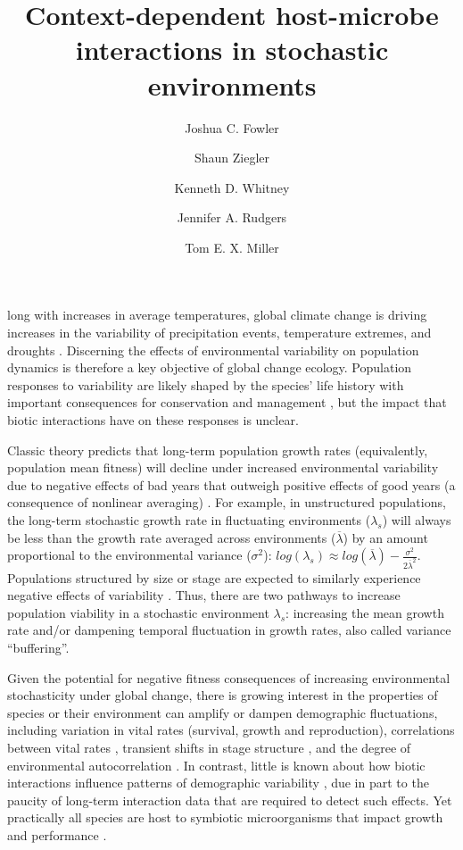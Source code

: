 \documentclass[9pt,twocolumn,twoside,lineno]{pnas-new}\usepackage[]{graphicx}\usepackage[]{xcolor}
\title{Context-dependent host-microbe interactions in stochastic environments}
\author[a,1]{Joshua C. Fowler}
\author[b]{Shaun Ziegler}
\author[b]{Kenneth D. Whitney}
\author[b]{Jennifer A. Rudgers}
\author[a]{Tom E. X. Miller}
\affil[a]{Rice University, Department of BioSciences, Houston, TX, 77005}
\affil[b]{University of New Mexico, Department of Biology, Albuquerque, NM, 87131}
\begin{document}
\maketitle
\thispagestyle{firststyle}

long with increases in average temperatures, global climate change is driving increases in the variability of precipitation events, temperature extremes, and droughts \cite{IPCC2012managing, seneviratne2012changes, stocker2013technical}.
Discerning the effects of environmental variability on population dynamics is therefore a key objective of global change ecology. 
Population responses to variability are likely shaped by the species' life history \cite{pfister1998patterns, morris2008longevity, saether2013life} with important consequences for conservation and management \cite{menges2000applications}, but the impact that biotic interactions have on these responses is unclear.

Classic theory predicts that long-term population growth rates (equivalently, population mean fitness) will decline under increased environmental variability due to negative effects of bad years that outweigh positive effects of good years (a consequence of nonlinear averaging) \cite{lewontin_population_1969,tuljapurkar_population_1982}.
For example, in unstructured populations, the long-term stochastic growth rate in fluctuating environments ($\lambda_s$) will always be less than the growth rate averaged across environments ($\overline{\lambda}$) by an amount proportional to the environmental variance ($\sigma^2$): $ log(\lambda_s)  \approx log(\overline{\lambda}) - \frac{\sigma^2}{2\overline{\lambda}^2}$.
Populations structured by size or stage are expected to similarly experience negative effects of variability \cite{cohen1979comparative, tuljapurkar2013population}.
Thus, there are two pathways to increase population viability in a stochastic environment $\lambda_s$: increasing the mean growth rate and/or dampening temporal fluctuation in growth rates, also called variance ``buffering''.

Given the potential for negative fitness consequences of increasing environmental stochasticity under global change, there is growing interest in the properties of species or their environment can amplify or dampen demographic fluctuations, including variation in vital rates (survival, growth and reproduction)\cite{morris2008longevity}, correlations between vital rates \cite{compagnoni2016effect}, transient shifts in stage structure \cite{ellis2013role}, and the degree of environmental autocorrelation \cite{tuljapurkar1980population, fieberg2001stochastic}. 
In contrast, little is known about how biotic interactions influence patterns of demographic variability \cite{hilde_demographic_2020}, due in part to the paucity of long-term interaction data that are required to detect such effects.
Yet practically all species are host to symbiotic microorganisms that impact growth and performance \cite{rodriguez2009fungal, mcfall2013animals}.
\end{document}
